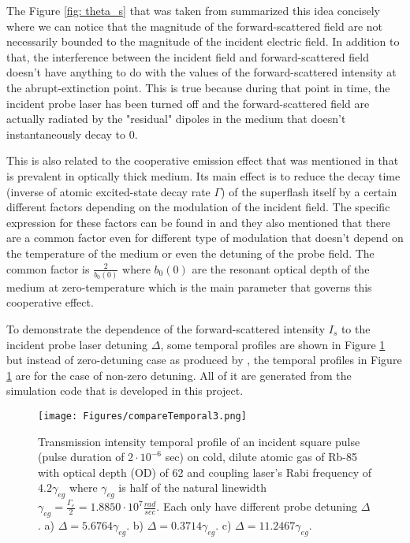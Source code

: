The Figure \ref{fig: theta_s} that was taken from  summarized this idea concisely where we can notice that the magnitude of the forward-scattered field are not necessarily bounded to the magnitude of the incident electric field. In addition to that, the interference between the incident field and forward-scattered field doesn't have anything to do with the values of the forward-scattered intensity at the abrupt-extinction point. This is true because during that point in time, the incident probe laser has been turned off and the forward-scattered field are actually radiated by the "residual" dipoles in the medium that doesn't instantaneously decay to $0$.

This is also related to the cooperative emission effect that was mentioned in  that is prevalent in optically thick medium. Its main effect is to reduce the decay time (inverse of atomic excited-state decay rate $\Gamma$) of the superflash itself by a certain different factors depending on the modulation of the incident field. The specific expression for these factors can be found in  and they also mentioned that there are a common factor even for different type of modulation that doesn't depend on the temperature of the medium or even the detuning of the probe field. The common factor is $\frac{2}{b_{0}(0)}$ where $b_{0}(0)$ are the resonant optical depth of the medium at zero-temperature which is the main parameter that governs this cooperative effect.

To demonstrate the dependence of the forward-scattered intensity $I_{s}$ to the incident probe laser detuning $\Delta$, some temporal profiles are shown in Figure \ref{fig: comparing temporal profile 2} but instead of zero-detuning case as produced by , the temporal profiles in Figure \ref{fig: comparing temporal profile 2} are for the case of non-zero detuning. All of it are generated from the simulation code that is developed in this project.

\begin{figure}
    \centering
    \texttt{[image: Figures/compareTemporal3.png]}
    \caption[Plots of Transmitted Intensity Temporal Profile for Different Detunings]{Transmission intensity temporal profile of an incident square pulse (pulse duration of $2\cdot10^{-6}$ sec) on cold, dilute atomic gas of Rb-85 with optical depth (OD) of 62 and coupling laser's Rabi frequency of $4.2\gamma_{eg}$ where $\gamma_{eg}$ is half of the natural linewidth $\gamma_{eg} = \frac{\Gamma_{e}}{2} = 1.8850 \cdot 10^{7} \frac{rad}{sec}$. Each only have different probe detuning $\Delta$. a) $\Delta = 5.6764\gamma_{eg}$. b) $\Delta = 0.3714\gamma_{eg}$. c) $\Delta = 11.2467\gamma_{eg}$.}
    \label{fig: comparing temporal profile 2}
\end{figure}

